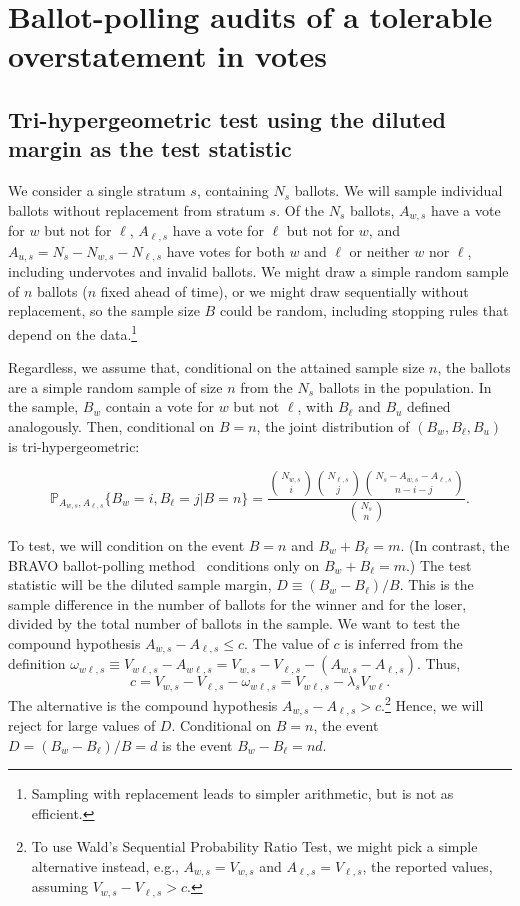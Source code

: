 \section{Ballot-polling audits of a tolerable overstatement in votes}
\label{sec:ballotPollError}

\subsection{Tri-hypergeometric test using the diluted margin as the test statistic}

We consider a single stratum $s$, containing $N_s$ ballots.
We will sample individual ballots without replacement from stratum $s$.
Of the $N_s$ ballots,
$A_{w,s}$ have a vote for $w$ but not for $\ell$, $A_{\ell,s}$ have a vote for $\ell$ but not for $w$, and $A_{u,s} = N_s - N_{w,s} - N_{\ell,s}$ have votes for both $w$ and $\ell$ or neither $w$ nor $\ell$, including undervotes and invalid ballots.
We might draw a simple random sample of $n$ ballots ($n$ fixed ahead of time), or we might draw 
sequentially without replacement, so the sample size $B$ could be random, including stopping rules that depend on the data.\footnote{%
   Sampling with replacement leads to simpler arithmetic, but is not as efficient.
}

Regardless, we assume that, conditional on the attained sample size $n$, the ballots are a simple random sample of size $n$ from the $N_s$ ballots in the population.
In the sample, $B_w$ contain a vote for $w$ but not $\ell$, with $B_\ell$ and $B_u$ defined analogously.
Then, conditional on $B=n$, the joint distribution of
$(B_w, B_\ell, B_u)$ is tri-hypergeometric:

\begin{equation}
    \mathbb{P}_{A_{w,s}, A_{\ell,s}} \{ B_w = i, B_\ell = j \vert B=n \} = 
     \frac{ {N_{w,s } \choose i}{N_{\ell,s} \choose j}{N_s - A_{w,s} - A_{\ell,s} \choose n-i-j}}{{N_s \choose n}}.
\end{equation}

To test, we will condition on the event $B=n$ and $B_w +B_\ell = m$. 
(In contrast, the BRAVO ballot-polling
method~\citep{lindemanEtal12}
conditions only on $B_w+B_\ell = m$.)
The test statistic will be the diluted sample margin, $D \equiv (B_w - B_\ell)/B$.
This is the sample difference in the number of ballots for the winner and for the loser, divided by the 
total number of ballots in the sample.
We want to test the compound hypothesis $A_{w,s} - A_{\ell,s} \le c$.
The value of $c$ is inferred from the definition
$\omega_{w\ell,s} \equiv V_{w\ell,s} - A_{w\ell,s} = V_{w,s} - V_{\ell,s} - (A_{w,s} -A_{\ell,s})$.
Thus,
$$
    c = V_{w,s} - V_{\ell,s} - \omega_{w\ell,s} = V_{w\ell,s} - \lambda_s V_{w\ell}.
$$
The alternative is the compound hypothesis 
$A_{w,s} - A_{\ell,s} > c$.\footnote{%
    To use Wald's Sequential Probability Ratio Test, we might pick a simple alternative instead, e.g.,
   $A_{w,s} = V_{w,s}$ and $A_{\ell,s} = V_{\ell,s}$, the reported values, assuming 
   $V_{w,s} - V_{\ell,s} > c$.
}
Hence, we will reject for large values of $D$.
Conditional on $B=n$, the event $D = (B_w - B_\ell)/B = d$ is the event $B_w - B_\ell = nd$.

